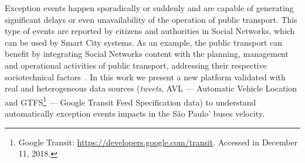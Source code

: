 \documentclass[runningheads]{llncs}
\begin{document}
Exception events happen sporadically or suddenly and are capable of generating significant delays or even unavailability of the operation of public transport. This type of events are reported by citizens and authorities in Social Networks, which can be used by Smart City systems. As an example, the public transport can benefit by integrating Social Networks content with the planning, management and operational activities of public transport, addressing their respective sociotechnical factors~\cite{kuflik2017automating}. In this work we present a new platform validated with real and heterogeneous data sources (\textit{tweets}, AVL --- Automatic Vehicle Location and GTFS\footnote{\label{googleTransit}Google Transit: \url{https://developers.google.com/transit}. Accessed in December 11, 2018.} --- Google Transit Feed Specification data) to understand automatically exception events impacts in the São Paulo' buses velocity.

\end{document}
